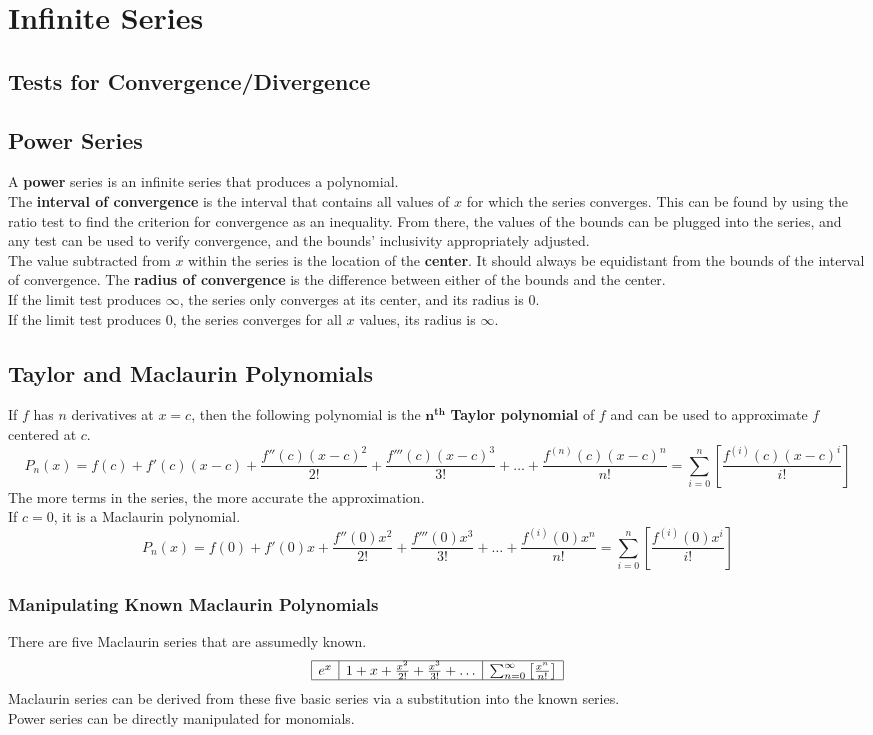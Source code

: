 \documentclass{../AP_Calculus}
\begin{document}
	\chapter{Infinite Series}
		\section*{Tests for Convergence/Divergence}
		\section{Power Series}
			A \textbf{power} series is an infinite series that produces a polynomial. \\
			The \textbf{interval of convergence} is the interval that contains all values of $x$ for which the series converges. This can be found by using the ratio test to find the criterion for convergence as an inequality. From there, the values of the bounds can be plugged into the series, and any test can be used to verify convergence, and the bounds' inclusivity appropriately adjusted. \\
			The value subtracted from $x$ within the series is the location of the \textbf{center}. It should always be equidistant from the bounds of the interval of convergence. The \textbf{radius of convergence} is the difference between either of the bounds and the center. \\
			If the limit test produces $\infty$, the series only converges at its center, and its radius is 0. \\
			If the limit test produces $0$, the series converges for all $x$ values, its radius is $\infty$.
		\section{Taylor and Maclaurin Polynomials}
			If $f$ has $n$ derivatives at $x = c$, then the following polynomial is the $\pmb{n^{th}}$ \textbf{Taylor polynomial} of $f$ and can be used to approximate $f$ centered at $c$.
			$$P_n(x) = f(c) + f'(c)(x - c) + \frac{f''(c)(x - c)^2}{2!} + \frac{f'''(c)(x - c)^3}{3!} + \ldots + \frac{f^{(n)}(c)(x - c)^n}{n!} = \sum_{i = 0}^{n}\left[\frac{f^{(i)}(c)(x - c)^i}{i!}\right]$$
			The more terms in the series, the more accurate the approximation. \\
			If $c = 0$, it is a Maclaurin polynomial.
			$$P_n(x) = f(0) + f'(0)x + \frac{f''(0)x^2}{2!} + \frac{f'''(0)x^3}{3!} + \ldots + \frac{f^{(i)}(0)x^n}{n!} = \sum_{i = 0}^{n}\left[\frac{f^{(i)}(0)x^i}{i!}\right]$$
		\subsection*{Manipulating Known Maclaurin Polynomials}
			There are five Maclaurin series that are assumedly known.
			$$\begin{array}{|l|l|l|}\hline
			e^x & 1 + x + \frac{x^2}{2!} + \frac{x^3}{3!} + \ldots & \sum_{n = 0}^\infty\left[\frac{x^n}{n!}\right] \\\hline
			
			\end{array}$$
			Maclaurin series can be derived from these five basic series via a substitution into the known series. \\
			Power series can be directly manipulated for monomials.
\end{document}
